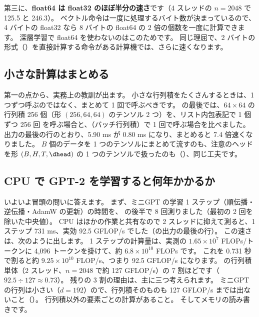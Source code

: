第三に、\textbf{float64 は float32 のほぼ半分の速さ}です（4 スレッドの $n=2048$ で 125.5 と 246.3）。
ベクトル命令は一度に処理するバイト数が決まっているので、4 バイトの float32 なら 8 バイトの float64 の 2 倍の個数を一度に計算できます。
深層学習で float64 を使わないのはこのためです。
同じ理屈で、2 バイトの形式（）を直接計算する命令がある計算機では、さらに速くなります。

\subsection*{小さな計算はまとめる}

第一の点から、実務上の教訓が出ます。
小さな行列積をたくさんするときは、1 つずつ呼ぶのではなく、まとめて 1 回で呼ぶべきです。
 の最後では、$64\times64$ の行列積 256 個（形 $(256,64,64)$ のテンソル 2 つ）を、リスト内包表記で 1 個ずつ 256 回  を呼ぶ場合と、（バッチ行列積）で 1 回で呼ぶ場合を比べました。
出力の最後の行のとおり、5.90 ms が 0.80 ms になり、まとめると 7.4 倍速くなりました。
$B$ 個のデータを 1 つのテンソルにまとめて流すのも、注意のヘッドを形 $(B,H,T,\dhead)$ の 1 つのテンソルで扱ったのも（）、同じ工夫です。

\subsection*{CPU で GPT-2 を学習すると何年かかるか}

いよいよ冒頭の問いに答えます。
まず、ミニGPT の学習 1 ステップ（順伝播・逆伝播・AdamW の更新）の時間を、 の後半で 8 回測りました（最初の 2 回を除いた中央値）。
CPU はほかの作業と共有なので 2 スレッドに抑えて測ると、1 ステップ 731 ms、実効 92.5 GFLOP/s でした（の出力の最後の行）。
この速さは、次のように出します。
1 ステップの計算量は、実測の $1.65\times10^{7}$ FLOPs/トークンに 4,096 トークンを掛けて、約 $6.8\times10^{10}$ FLOPs です。
これを 0.731 秒で割ると約 $9.25\times10^{10}$ FLOP/s、つまり 92.5 GFLOP/s になります。
の行列積単体（2 スレッド、$n=2048$ で約 127 GFLOP/s）の 7 割ほどです（$92.5\div127\approx0.73$）。
残りの 3 割の理由は、主に三つ考えられます。
ミニGPT の行列は小さい（$d=192$）ので、行列積そのものも 127 GFLOP/s までは出ないこと（）。
行列積以外の要素ごとの計算があること。
そしてメモリの読み書きです。

